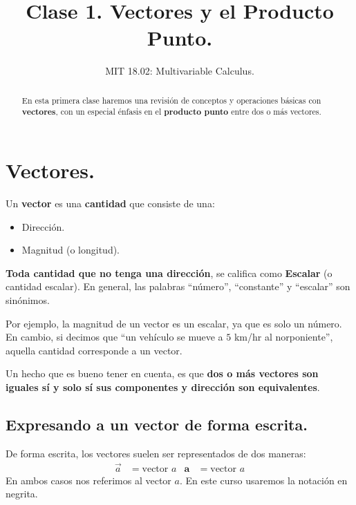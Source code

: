 \documentclass[12pt]{article}
\title{Clase 1. Vectores y el Producto Punto.}
\author{MIT 18.02: Multivariable Calculus.}
\date{}
\begin{document}
\maketitle

\begin{abstract}
\noindent En esta primera clase haremos una revisión de conceptos y operaciones básicas con \textbf{vectores}, con un especial énfasis en el \textbf{producto punto} entre dos o más vectores.
\end{abstract}

\section{Vectores.}

Un \textbf{vector} es una \textbf{cantidad} que consiste de una:

\begin{itemize}
\item Dirección.
\item Magnitud (o longitud).
\end{itemize}

\textbf{Toda cantidad que no tenga una dirección}, se califica como \textbf{Escalar} (o cantidad escalar). En general, las palabras ``número'', ``constante'' y ``escalar'' son sinónimos.

Por ejemplo, la magnitud de un vector es un escalar, ya que es solo un número. En cambio, si decimos que ``un vehículo se mueve a $5$ km/hr al norponiente'', aquella cantidad corresponde a un vector.

Un hecho que es bueno tener en cuenta, es que \textbf{dos o más vectores son iguales sí y solo sí sus componentes y dirección son equivalentes}.


\subsection{Expresando a un vector de forma escrita.}

De forma escrita, los vectores suelen ser representados de dos maneras:
\begin{align*}
  \vec{a} &= \text{vector } a & \mathbf{a} &= \text{vector } a
\end{align*}
En ambos casos nos referimos al vector $a$. En este curso usaremos la notación en negrita.
\end{document}
